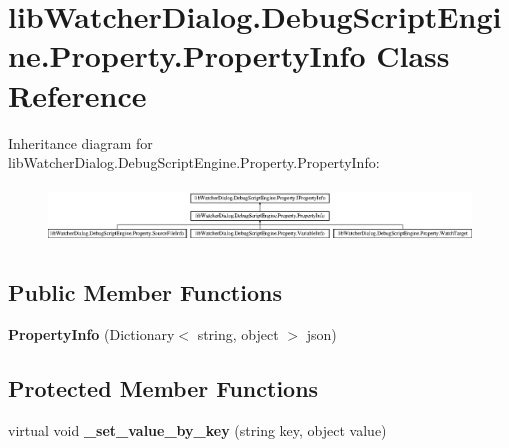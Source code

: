 \hypertarget{classlib_watcher_dialog_1_1_debug_script_engine_1_1_property_1_1_property_info}{\section{lib\+Watcher\+Dialog.\+Debug\+Script\+Engine.\+Property.\+Property\+Info Class Reference}
\label{classlib_watcher_dialog_1_1_debug_script_engine_1_1_property_1_1_property_info}
}
Inheritance diagram for lib\+Watcher\+Dialog.\+Debug\+Script\+Engine.\+Property.\+Property\+Info\+:\begin{figure}[H]
\begin{center}
\leavevmode
\includegraphics[height=1.517615cm]{classlib_watcher_dialog_1_1_debug_script_engine_1_1_property_1_1_property_info}
\end{center}
\end{figure}
\subsection*{Public Member Functions}
\begin{DoxyCompactItemize}
\item 
\hypertarget{classlib_watcher_dialog_1_1_debug_script_engine_1_1_property_1_1_property_info_af34fdd723f1ba7b4347d1f945ddb011f}{{\bfseries Property\+Info} (Dictionary$<$ string, object $>$ json)}\label{classlib_watcher_dialog_1_1_debug_script_engine_1_1_property_1_1_property_info_af34fdd723f1ba7b4347d1f945ddb011f}

\end{DoxyCompactItemize}
\subsection*{Protected Member Functions}
\begin{DoxyCompactItemize}
\item 
\hypertarget{classlib_watcher_dialog_1_1_debug_script_engine_1_1_property_1_1_property_info_afa2c8a92356367ddd86cf2f3ab58b09c}{virtual void {\bfseries \+\_\+set\+\_\+value\+\_\+by\+\_\+key} (string key, object value)}\label{classlib_watcher_dialog_1_1_debug_script_engine_1_1_property_1_1_property_info_afa2c8a92356367ddd86cf2f3ab58b09c}

\end{DoxyCompactItemize}
